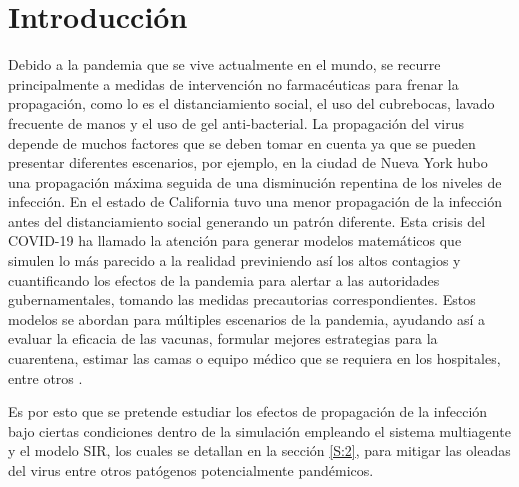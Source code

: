 \documentclass[final,6p,times,twocolumn]{elsarticle}
\begin{document}

\section{Introducción}
Debido a la pandemia que se vive actualmente en el mundo, se recurre principalmente a medidas de intervención no farmacéuticas para frenar la propagación, como lo es el distanciamiento social, el uso del cubrebocas, lavado frecuente de manos y el uso de gel anti-bacterial. La propagación del virus depende de muchos factores que se deben tomar en cuenta ya que se pueden presentar diferentes escenarios, por ejemplo, en la ciudad de Nueva York hubo una propagación máxima seguida de una disminución repentina de los niveles de infección. En el estado de California tuvo una menor propagación de la infección antes del distanciamiento social \cite{KOMAROVA2021100463} generando un patrón diferente.
Esta crisis del COVID-19 ha llamado la atención para generar modelos matemáticos que simulen lo más parecido a la realidad previniendo así los altos contagios y cuantificando los efectos de la pandemia para alertar a las autoridades gubernamentales, tomando las medidas precautorias correspondientes. Estos modelos se abordan para múltiples escenarios de la pandemia, ayudando así a evaluar la eficacia de las vacunas, formular mejores estrategias para la cuarentena, estimar las camas o equipo médico que se requiera en los hospitales, entre otros \cite{JORGE2021100465}.

Es por esto que se pretende estudiar los efectos de propagación de la infección bajo ciertas condiciones dentro de la simulación empleando el sistema multiagente y el modelo SIR, los cuales se detallan en la sección \ref{S:2}, para mitigar las oleadas del virus entre otros patógenos potencialmente pandémicos.

\label{S:1}


%
\end{document}
